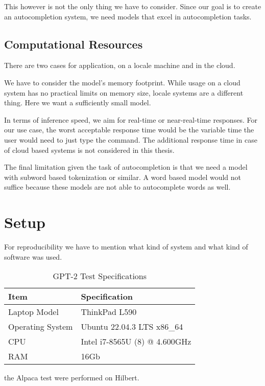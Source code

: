 This however is not the only thing we have to consider. Since our goal is to create an autocompletion system, we need models that excel in autocompletion tasks.



\subsection{Computational Resources}


There are two cases for application, on a locale machine and in the cloud.



We have to consider the model's memory footprint. While usage on a cloud system has no practical limits on memory size, locale systems are a different thing.
Here we want a sufficiently small model.

In terms of inference speed, we aim for real-time or near-real-time responses. For our       use case, the worst acceptable response time would be the variable time the user would need to just type the command. The additional response time in case of cloud based systems is not considered in this thesis.

The final limitation given the task of autocompletion is that we need a model with subword based tokenization or similar. A word based model would not suffice because these models are not able to autocomplete words as well.


\section{Setup}\raggedbottom
For reproducibility we have to mention what kind of system and what kind of software was used.

\begin{table}[h]
\centering
\begin{tabular}{|l|l|}
\hline
\textbf{Item} & \textbf{Specification} \\
\hline
Laptop Model & ThinkPad L590 \\
\hline
Operating System & Ubuntu 22.04.3 LTS x86\_64 \\
\hline
CPU & Intel i7-8565U (8) @ 4.600GHz \\
\hline
RAM & 16Gb \\
\hline
\end{tabular}
\caption{GPT-2 Test Specifications }
\end{table}

the Alpaca test were performed on Hilbert.

